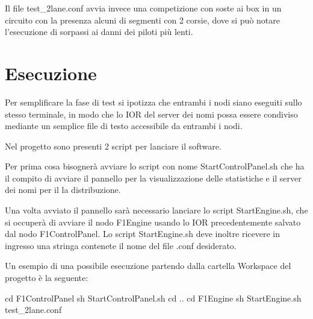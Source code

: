 \documentclass[a4paper,11pt, twoside, openright]{book}
\begin{document}
	Il file test\_2lane.conf avvia invece una competizione con soste ai box in un circuito con la presenza alcuni di segmenti
	con 2 corsie, dove si può notare l'esecuzione di sorpassi ai danni dei piloti più lenti.
	
    \section{Esecuzione}
      Per semplificare la fase di test si ipotizza che entrambi i nodi siano eseguiti sullo stesso terminale, in modo che lo IOR 
      del server dei nomi possa essere condiviso mediante un semplice file di testo accessibile da entrambi i nodi.
      
      Nel progetto sono presenti 2 script per lanciare il software. 
      
      Per prima cosa bisognerà avviare lo script con nome StartControlPanel.sh che ha il compito di avviare il pannello
      per la visualizzazione delle statistiche e il server dei nomi per il la distribuzione.
      
      Una volta avviato il pannello sarà necessario lanciare lo script StartEngine.sh, che si occuperà di avviare il nodo F1Engine
      usando lo IOR precedentemente salvato dal nodo F1ControlPanel.
      Lo script StartEngine.sh deve inoltre ricevere in ingresso una stringa contenete il nome del file .conf
      desiderato.
      
      Un esempio di una possibile esecuzione partendo dalla cartella Workspace del progetto è la seguente:
      
      \begin{xml}
        cd F1ControlPanel
	sh StartControlPanel.sh
	cd ..
	cd F1Engine
	sh StartEngine.sh test_2lane.conf
      \end{xml}
\end{document}
